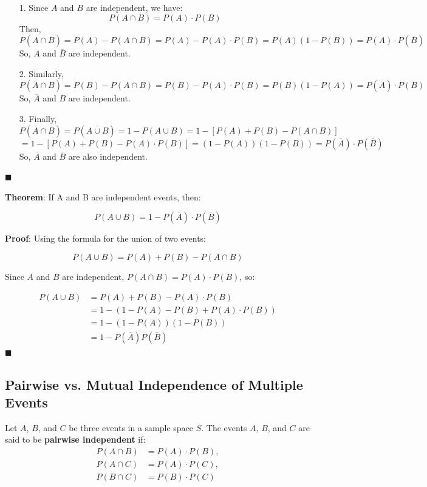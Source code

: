 \documentclass[twoside]{book}
\begin{document}
\begin{itemize}
  \item[1.] Since \( A \) and \( B \) are independent, we have:
  \[
  P(A \cap B) = P(A)\cdot P(B)
  \]
  Then,
  \[
  P(A \cap \overline{B}) = P(A) - P(A \cap B) = P(A) - P(A)\cdot P(B) = P(A)(1 - P(B)) = P(A)\cdot P(\overline{B})
  \]
  So, \( A \) and \( \overline{B} \) are independent.

  \item[2.] Similarly,
  \[
  P(\overline{A} \cap B)  = P(B) - P(A \cap B) = P(B) - P(A)\cdot P(B) = P(B)(1 - P(A)) = P(\overline{A})\cdot P(B)
  \]
  So, \( \overline{A} \) and \( B \) are independent.

  \item[3.] Finally,
  \[
  P(\overline{A} \cap \overline{B}) = P(\overline{A \cup B}) = 1 - P(A \cup B) = 1 - [P(A) + P(B) - P(A \cap B)]
  \]
  \[
  = 1 - [P(A) + P(B) - P(A)\cdot P(B)] = (1 - P(A))(1 - P(B)) = P(\overline{A})\cdot P(\overline{B})
  \]
  So, \( \overline{A} \) and \( \overline{B} \) are also independent.
\end{itemize}
\hfill\(\blacksquare\)

\begin{textbox}
    \textbf{Theorem}: If A and B are independent events, then:

\[
P(A \cup B) = 1 - P(\overline{A})\cdot P(\overline{B})
\]
\end{textbox}

\textbf{Proof}: Using the formula for the union of two events:

\[
P(A \cup B) = P(A) + P(B) - P(A \cap B)
\]

Since \( A \) and \( B \) are independent, \( P(A \cap B) = P(A)\cdot P(B) \), so:

\begin{align*}
    P(A \cup B) &= P(A) + P(B) - P(A)\cdot P(B) \\
    &= 1 - \left(1 - P(A) - P(B) + P(A)\cdot P(B)\right) \\
    &= 1- (1-P(A))(1-P(B)) \\
    &= 1 - P(\overline{A})P(\overline{B})
\end{align*}
\hfill\(\blacksquare\)

\subsection{Pairwise vs. Mutual Independence of Multiple Events}

Let \( A \), \( B \), and \( C \) be three events in a sample space \( S \). The events \( A \), \( B \), and \( C \) are said to be \textbf{pairwise independent} if:
\[
\begin{aligned}
P(A \cap B) &= P(A) \cdot P(B), \\
P(A \cap C) &= P(A) \cdot P(C), \\
P(B \cap C) &= P(B) \cdot P(C)
\end{aligned}
\]
\end{document}
